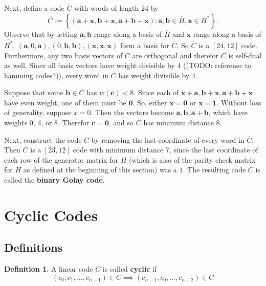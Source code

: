 \documentclass{article}
\newcommand{\ext}[1]{\overline{#1}}
\renewcommand{\=}{\equiv}
\newcommand{\set}[1]{\left\{ #1 \right\}}
\renewcommand{\v}{\mathbf}
\newcommand{\x}{{\v x}}
\theoremstyle{plain}
\theoremstyle{definition}
\newtheorem{defn}{Definition}[subsection]
\newcommand{\TODO}[1]{(TODO: #1)}
\begin{document}
Next, define a code $\ext{C}$ with words of length 24 by
$$ \ext{C} := \set{ (\v a + \x, \v b + \x, \v a + \v b + \x) : \v a,\v b \in \ext{H}, \x \in \ext{H^*} }. $$
Observe that by letting $\v a, \v b$ range along a basis of $\ext H$ and $\x$ range along a basis of $\ext{H^*}$, $(\v a, 0, \v a), (0, \v b, \v b), (\x, \x, \x)$ form a basis for $\ext{C}$.
So $\ext{C}$ is a $[24,12]$ code.
Furthermore, any two basis vectors of $\ext{C}$ are orthogonal and therefor $\ext{C}$ is self-dual as well.
Since all basis vectors have weight divisible by 4 (\TODO{referenec to hamming codes?}), every word in $\ext{C}$ has weight divisible by 4.

Suppose that some $\v b \in \ext{C}$ has $w(\v c) < 8$.
Since each of $\x + \v a, \v b + \x, \v a + \v b + \x$ have even weight, one of them must be $\v 0$.
So, either $\x = \v 0$ or $\x = \v 1$.
Without loss of generality, suppose $x = 0$.
Then the vectors become $\v a, \v b, \v a + \v b$, which have weights 0, 4, or 8.
Therefor $\v c = \v 0$, and so $\ext{C}$ has minimum distance 8.

Next, construct the code $C$ by removing the last coordinate of every word in $\ext{C}$.
Then $C$ is a $[23,12]$ code with minimum distance 7, since the last coordinate of each row of the generator matrix for $H$ (which is also of the parity check matrix for $H$ as defined at the beginning of this section) was a $1$.
The resulting code $C$ is called the \textbf{binary Golay code}.

\section{Cyclic Codes}

\subsection{Definitions}

\begin{defn}
  A linear code $C$ is called \textbf{cyclic} if
  $$ (c_0, c_1, \dots, c_{n-1}) \in C \implies (c_{n-1}, c_0, \dots, c_{n-2}) \in C $$
\end{defn}
\end{document}
